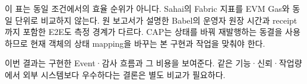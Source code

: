 이 표는 동일 조건에서의 효율 순위가 아니다. Sahai의 Fabric 지표를 EVM Gas와 동일 단위로 비교하지 않는다.
원 보고서가 설명한 Babel의 운영자 원장 시간과 receipt까지 포함한 E2E도 측정 경계가 다르다.
CAP는 상태를 바꿔 재발행하는 동결을 사용하므로 현재 객체의 상태 mapping을 바꾸는 본 구현과 작업을 맞춰야 한다.

이번 결과는 구현한 Event·감사 흐름과 그 비용을 보여준다.
같은 기능·신뢰·작업량에서 외부 시스템보다 우수하다는 결론은 별도 비교가 필요하다.


